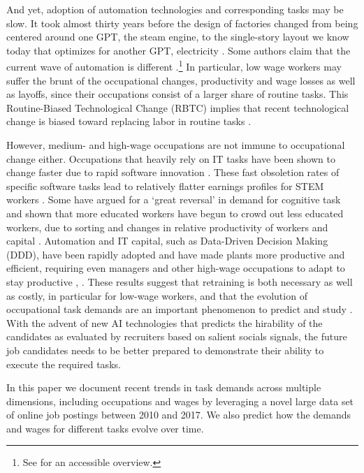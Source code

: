 \documentclass[letterpaper]{article} %
\begin{document}
\par
And yet, adoption of automation technologies and corresponding tasks may be slow. It took almost thirty years before the design of factories changed from being centered around one GPT, the steam engine, to the single-story layout we know today that optimizes for another GPT, electricity \cite{BrynjolfssonMcAfee2014}. Some authors claim that the current wave of automation is different \cite{duckworth2019inferring}.\footnote{See \cite{wajcman2017automation} for an accessible overview.}
In particular, low wage workers may suffer the brunt of the occupational changes, productivity and wage losses as well as layoffs, since their occupations consist of a larger share of routine tasks. This Routine-Biased Technological Change (RBTC) implies that recent technological change is biased toward replacing labor in routine tasks \cite{GoosManningSalomons2014}.

However, medium- and high-wage occupations are not immune to occupational change either. Occupations that heavily rely on IT tasks have been shown to change faster due to rapid software innovation \cite{Hershbein2018}. These fast obsoletion rates of specific software tasks lead to relatively flatter earnings profiles for STEM workers \cite{Deming2018a}. Some have argued for a `great reversal' in demand for cognitive task and shown that more educated workers have begun to crowd out less educated workers, due to sorting and changes in relative productivity of workers and capital \cite{BeaudryGreenSand2015}. Automation and IT capital, such as Data-Driven Decision Making (DDD), have been rapidly adopted and have made plants more productive and efficient, requiring even managers and other high-wage occupations to adapt to stay productive \cite{Brynjolfsson2016}, \cite{Bartel2007}. These results suggest that retraining is both necessary as well as costly, in particular for low-wage workers, and that the evolution of occupational task demands are an important phenomenon to predict and study \cite{atalay2019evolution}. With the advent of new AI technologies \cite{hemamou2019hirenet} that predicts the hirability of the candidates as evaluated by recruiters based on salient socials signals, the future job candidates needs to be better prepared to demonstrate their ability to execute the required tasks.
\par
In this paper we document recent trends in task demands across multiple dimensions, including occupations and wages by leveraging a novel large data set of online job postings between 2010 and 2017. We also predict how the demands and wages for different tasks evolve over time.
\end{document}
